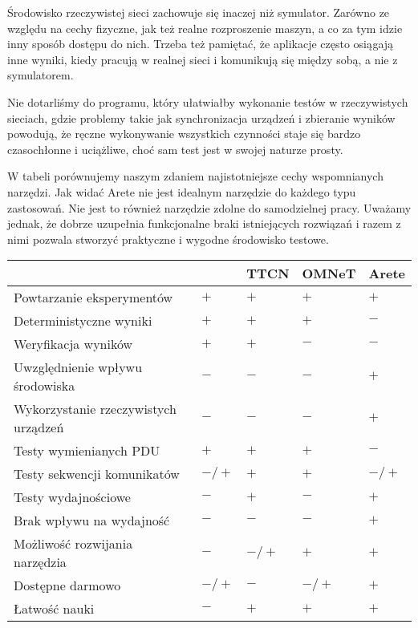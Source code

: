 \documentclass[00-praca-magisterska.tex]{subfiles}
\begin{document}
Środowisko rzeczywistej sieci zachowuje się inaczej niż symulator. Zarówno ze
względu na cechy fizyczne, jak też realne rozproszenie maszyn, a co za tym
idzie inny sposób dostępu do nich. Trzeba też pamiętać, że aplikacje często
osiągają inne wyniki, kiedy pracują w realnej sieci i komunikują się między
sobą, a nie z symulatorem.

Nie dotarliśmy do programu, który ułatwiałby wykonanie testów w
rzeczywistych sieciach, gdzie problemy takie jak synchronizacja urządzeń i
zbieranie wyników powodują, że ręczne wykonywanie wszystkich czynności staje
się bardzo czasochłonne i uciążliwe, choć sam test jest w swojej naturze prosty.

W tabeli  porównujemy naszym zdaniem najistotniejsze cechy
wspomnianych narzędzi. Jak widać Arete nie jest idealnym narzędzie do każdego
typu zastosowań. Nie jest to również narzędzie zdolne do samodzielnej pracy.
Uważamy jednak, że dobrze uzupełnia funkcjonalne braki istniejących rozwiązań i
razem z nimi pozwala stworzyć praktyczne i wygodne środowisko testowe.

\begin{small}
\begin{center}
   \begin{tabular}{ l || C{1.1cm} | C{1.1cm} | C{1.1cm} | C{1.1cm}   }
      \hline
      & \small{\parbox[top][2.4em][c]{1.1cm}{}} & \small{TTCN} & \small{OMNeT} & \small{Arete} \\
      \hline
      Powtarzanie eksperymentów & $+$ & $+$ & $+$ & $+$ \\
      \hline
      Deterministyczne wyniki & $+$ & $+$ & $+$ & $-$ \\
      \hline
      Weryfikacja wyników & $+$ & $+$ & $-$ & $-$ \\
      \hline
      Uwzględnienie wpływu środowiska & $-$ & $-$ & $-$ & $+$ \\
      \hline
      Wykorzystanie rzeczywistych urządzeń & $-$ & $-$ & $-$ & $+$ \\
      \hline
      Testy wymienianych PDU & $+$ & $+$ & $+$ & $-$ \\
      \hline
      Testy sekwencji komunikatów & $-/+$ & $+$ & $+$ & $-/+$ \\
      \hline
      Testy wydajnościowe & $-$ & $+$ & $-$ & $+$ \\
      \hline
      Brak wpływu na wydajność & $-$ & $-$ & $-$ & $+$ \\
      \hline
      Możliwość rozwijania narzędzia & $-$ & $-/+$ & $+$ & $+$ \\
      \hline
      Dostępne darmowo & $-/+$ & $-$ & $-/+$ & $+$ \\
      \hline
      Łatwość nauki & $-$ &  $+$ & $+$ & $+$ \\
      \hline

  \end{tabular}
\end{center}
\end{small}

\end{document}
